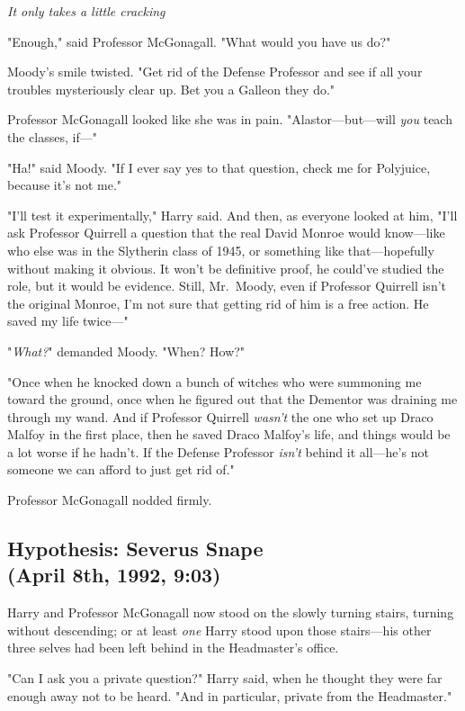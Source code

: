 \emph{It only takes a little cracking{\el}}

"Enough," said Professor McGonagall. "What would you have us do?"

Moody's smile twisted. "Get rid of the Defense Professor and see if all your
troubles mysteriously clear up. Bet you a Galleon they do."

Professor McGonagall looked like she was in pain. "Alastor—but—will
\emph{you} teach the classes, if—"

"Ha!" said Moody. "If I ever say yes to that question, check me for Polyjuice,
because it's not me."

"I'll test it experimentally," Harry said. And then, as everyone looked at him,
"I'll ask Professor Quirrell a question that the real David Monroe would
know—like who else was in the Slytherin class of 1945, or something like
that—hopefully without making it obvious. It won't be definitive proof, he
could've studied the role, but it would be evidence. Still, Mr.~Moody, even if
Professor Quirrell isn't the original Monroe, I'm not sure that getting rid of
him is a free action. He saved my life twice—"

"\emph{What?}" demanded Moody. "When? How?"

"Once when he knocked down a bunch of witches who were summoning me toward the
ground, once when he figured out that the Dementor was draining me through my
wand. And if Professor Quirrell \emph{wasn't} the one who set up Draco Malfoy
in the first place, then he saved Draco Malfoy's life, and things would be a
lot worse if he hadn't. If the Defense Professor \emph{isn't} behind it
all—he's not someone we can afford to just get rid of."

Professor McGonagall nodded firmly.
\sbreak
\vspace{-2\baselineskip}
\subsection{Hypothesis: Severus Snape\\
(April 8th, 1992, 9:03\PM)}

Harry and Professor McGonagall now stood on the slowly turning stairs, turning
without descending; or at least \emph{one} Harry stood upon those stairs—his
other three selves had been left behind in the Headmaster's office.

"Can I ask you a private question?" Harry said, when he thought they were far
enough away not to be heard. "And in particular, private from the Headmaster."

